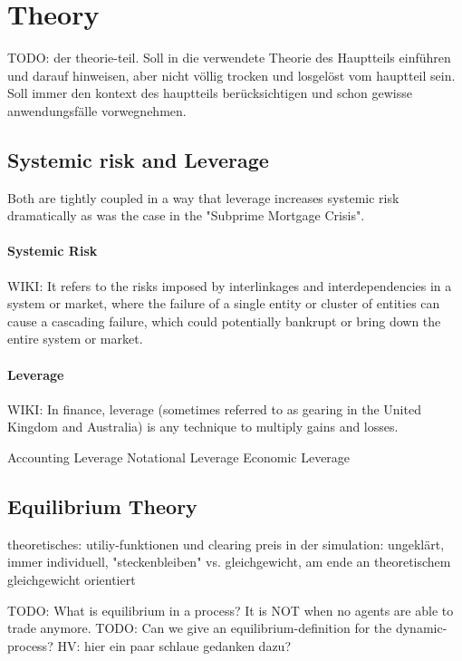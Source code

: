 \documentclass[../Bachelorarbeit.tex]{subfiles}
\begin{document}
\chapter{Theory}
\label{ch:theory}

TODO: der theorie-teil. Soll in die verwendete Theorie des Hauptteils einführen und darauf hinweisen, aber nicht völlig trocken und losgelöst vom hauptteil sein. Soll immer den kontext des hauptteils berücksichtigen und schon gewisse anwendungsfälle vorwegnehmen.

\section{Systemic risk and Leverage}
Both are tightly coupled in a way that leverage increases systemic risk dramatically as was the case in the "Subprime Mortgage Crisis".

\subsubsection{Systemic Risk}
WIKI: It refers to the risks imposed by interlinkages and interdependencies in a system or market, where the failure of a single entity or cluster of entities can cause a cascading failure, which could potentially bankrupt or bring down the entire system or market.

\cite{Milan2010}

\subsubsection{Leverage}
WIKI: In finance, leverage (sometimes referred to as gearing in the United Kingdom and Australia) is any technique to multiply gains and losses.

Accounting Leverage
Notational Leverage
Economic Leverage

\section{Equilibrium Theory}	
		theoretisches: utiliy-funktionen und clearing preis
		in der simulation: ungeklärt, immer individuell, "steckenbleiben" vs. gleichgewicht, am ende an theoretischem gleichgewicht orientiert

TODO: What is equilibrium in a process? It is NOT when no agents are able to trade anymore.
TODO: Can we give an equilibrium-definition for the dynamic-process? HV: hier ein paar schlaue gedanken dazu?
\end{document}
